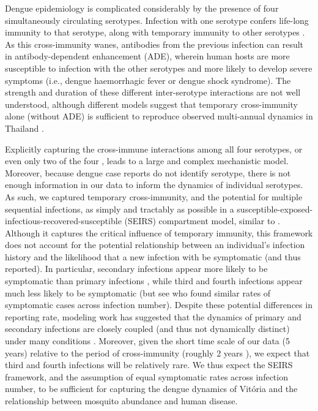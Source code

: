 \documentclass[10pt,letterpaper]{article}
\begin{document}
Dengue epidemiology is complicated considerably by the presence of four simultaneously circulating serotypes.
Infection with one serotype confers life-long immunity to that serotype, along with temporary immunity to other serotypes \cite{Wearing2006}.  
As this cross-immunity wanes, antibodies from the previous infection can result in antibody-dependent enhancement (ADE), wherein human hosts are more susceptible to infection with the other serotypes and more likely to develop severe symptoms (i.e., dengue haemorrhagic fever or dengue shock syndrome)\cite{Wearing2006}.
The strength and duration of these different inter-serotype interactions are not well understood, although different models suggest that temporary cross-immunity alone (without ADE) is sufficient to reproduce observed multi-annual dynamics in Thailand \cite{Wearing2006,Reich2013}.

Explicitly capturing the cross-immune interactions among all four serotypes, or even only two of the four \cite{Aguiar2013}, leads to a large and complex mechanistic model.
Moreover, because dengue case reports do not identify serotype, there is not enough information in our data to inform the dynamics of individual serotypes.
As such, we captured temporary cross-immunity, and the potential for multiple sequential infections, as simply and tractably as possible in a susceptible-exposed-infectious-recovered-susceptible (SEIRS) compartment model, similar to \cite{Newton1992, Burattini2008, Pinho2010, Hooten2010}.
Although it captures the critical influence of temporary immunity, this framework does not account for the potential relationship between an individual's infection history and the likelihood that a new infection with be symptomatic (and thus reported).
In particular, secondary infections appear more likely to be symptomatic than primary infections \cite{Imai2016,Clapham2017}, while third and fourth infections appear much less likely to be symptomatic \cite{Olkowski2013} (but see \cite{Montoya2013} who found similar rates of symptomatic cases across infection number).
Despite these potential differences in reporting rate, modeling work has suggested that the dynamics of primary and secondary infections are closely coupled (and thus not dynamically distinct) under many conditions \cite{Schwartz2005}.
Moreover, given the short time scale of our data (5 years) relative to the period of cross-immunity (roughly 2 years \cite{Reich2013}), we expect that third and fourth infections will be relatively rare.
We thus expect the SEIRS framework, and the assumption of equal symptomatic rates across infection number, to be sufficient for capturing the dengue dynamics of Vit\'oria and the relationship between mosquito abundance and human disease.
\end{document}
